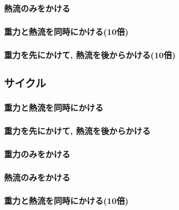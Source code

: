 

\subsubsection{熱流のみをかける}



\subsubsection{重力と熱流を同時にかける(10倍)}



\subsubsection{重力を先にかけて, 熱流を後からかける(10倍)}




\subsection{サイクル}

\subsubsection{重力と熱流を同時にかける}



\subsubsection{重力を先にかけて, 熱流を後からかける}



\subsubsection{重力のみをかける}



\subsubsection{熱流のみをかける}



\subsubsection{重力と熱流を同時にかける(10倍)}

